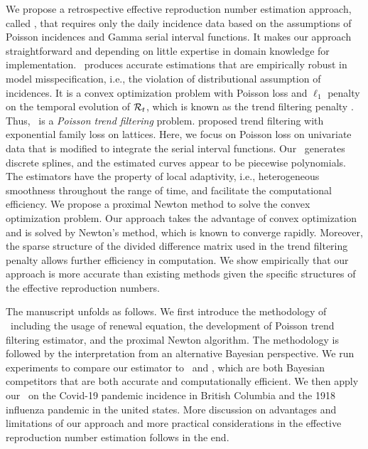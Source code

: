 We propose a retrospective effective reproduction number estimation approach, called \RtEstim, that requires only the daily incidence data based on the assumptions of Poisson incidences and Gamma serial interval functions. It makes our approach straightforward and depending on little expertise in domain knowledge for implementation. \RtEstim\ produces accurate estimations that are empirically robust in model misspecification, i.e., the violation of distributional assumption of incidences. 
% 
It is a convex optimization problem with Poisson loss and $\ell_1$ penalty on the temporal evolution of $\mathcal{R}_t$, which is known as the trend filtering penalty \citep{kim2009ell_1,tibshirani2014adaptive,sadhanala2022exponential}. Thus, \RtEstim\ is a \textit{Poisson trend filtering} problem. \cite{sadhanala2022exponential} proposed trend filtering with exponential family loss on lattices. Here, we focus on Poisson loss on univariate data that is modified to integrate the serial interval functions. Our \RtEstim\ generates discrete splines, and the estimated curves appear to be piecewise polynomials. The estimators have the property of local adaptivity, i.e., heterogeneous smoothness throughout the range of time, and facilitate the computational efficiency. %
We propose a proximal Newton method to solve the convex optimization problem. Our approach takes the advantage of convex optimization and is solved by Newton's method, which is known to converge rapidly. %
Moreover, the sparse structure of the divided difference matrix used in the trend filtering penalty allows further efficiency in computation. 
We show empirically that our approach is more accurate than existing methods given the specific structures of the effective reproduction numbers. 

The manuscript unfolds as follows. We first introduce the methodology of \RtEstim\ including the usage of renewal equation, the development of Poisson trend filtering estimator, and the proximal Newton algorithm. The methodology is followed by the interpretation from an alternative Bayesian perspective. We run experiments to compare our estimator to \EpiEstim\ and \EpiLPS, which are both Bayesian competitors that are both accurate and computationally efficient. We then apply our \RtEstim\ on the Covid-19 pandemic incidence in British Columbia and the 1918 influenza pandemic in the united states. More discussion on advantages and limitations of our approach and more practical considerations in the effective reproduction number estimation follows in the end. 
